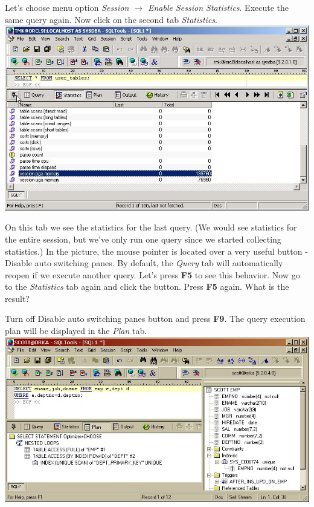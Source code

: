 \documentclass[a4paper,titlepage]{article}
\begin{document}
Let's choose menu option \emph{Session $\to$ Enable Session Statistics}. Execute the same query again.  Now click on the second tab \emph{Statistics}.\\
\includegraphics[bb=0 0 734 445,width=\textwidth]{01main03}

On this tab we see the statistics for the last query.  (We would see statistics for the entire session, but we've only run one query since we started collecting statistics.)  In the picture, the mouse pointer is located over a very useful 
button - Disable auto switching panes. By default, the \emph{Query} tab will automatically reopen if we execute another query. 
Let's press \textbf{F5} to see this behavior. Now go to the \emph{Statistics} tab again and click the button. Press \textbf{F5} again. What is the result?

Turn off Disable auto switching panes button and press \textbf{F9}. The query execution plan will be displayed in the \emph{Plan} tab.\\
\includegraphics[bb=0 0 743 403,width=\textwidth]{01main04}
\end{document}
